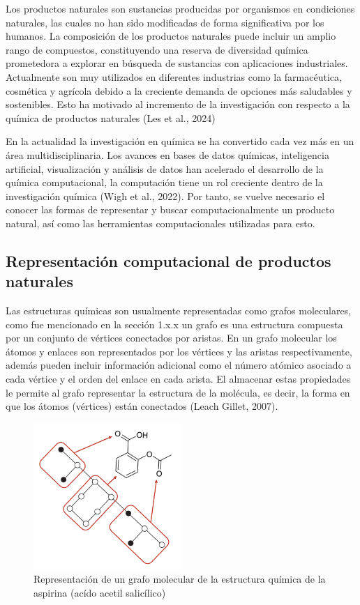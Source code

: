Los productos naturales son sustancias producidas por organismos en condiciones naturales, las cuales no han sido modificadas de forma significativa por los humanos. La composición de los productos naturales puede incluir un amplio rango de compuestos, constituyendo una reserva de diversidad química prometedora a explorar en búsqueda de sustancias con aplicaciones industriales. Actualmente son muy utilizados en diferentes industrias como la farmacéutica, cosmética y agrícola debido a la creciente demanda de opciones más saludables y sostenibles. Esto ha motivado al incremento de la investigación con respecto a la química de productos naturales  (Les et al., 2024)

En la actualidad la investigación en química se ha convertido cada vez más en un área multidisciplinaria. Los avances en bases de datos químicas, inteligencia artificial, visualización y análisis de datos han acelerado el desarrollo de la química computacional, la computación tiene un rol creciente dentro de la investigación química (Wigh et al., 2022). Por tanto, se vuelve necesario el conocer las formas de representar y buscar computacionalmente un producto natural, así como las herramientas computacionales utilizadas para esto.

\subsection{Representación computacional de productos naturales}


Las estructuras químicas son usualmente representadas como grafos moleculares, como fue mencionado en la sección 1.x.x un grafo es una estructura compuesta por un conjunto de vértices conectados por aristas. En un grafo molecular los átomos y enlaces son representados por los vértices y las aristas respectivamente, además pueden incluir información adicional como el número atómico asociado a cada vértice y el orden del enlace en cada arista. El almacenar estas propiedades le permite al grafo representar la estructura de la molécula, es decir, la forma en que los átomos (vértices) están conectados (Leach Gillet, 2007).  

\begin{figure}[h!]
    \centering
    \includegraphics[width=0.5\textwidth]{Images/np-graph-representation.png}
    \caption{Representación de un grafo molecular de la estructura química de la aspirina (acído acetil salicílico)}
    \label{fig:np-graph-representation}
\end{figure}


